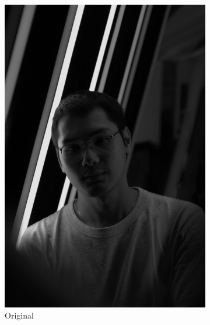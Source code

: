 \documentclass[12pt,a4paper]{article}
\begin{document}
\begin{figure}[htb]
    \centering
	\begin{subfigure}[h!]{0.24\textwidth}
		\centering
		\includegraphics[width=\textwidth]{original.png}
		\caption{Original}
		\label{fig:orig}
	\end{subfigure}
	\begin{subfigure}[h!]{0.24\textwidth}
		\centering

\end{subfigure}
\end{figure}
\end{document}
